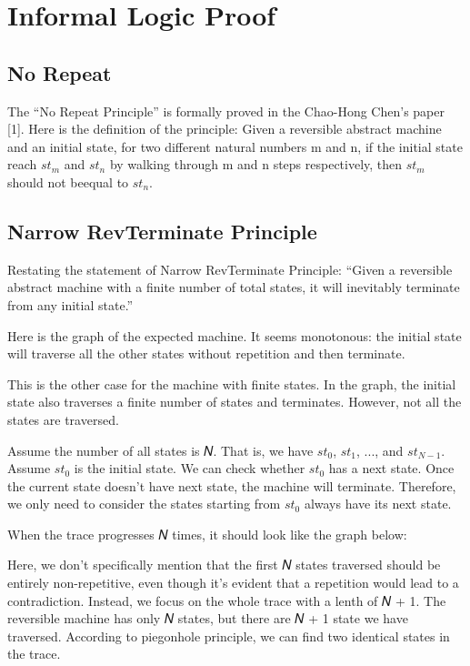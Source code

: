 \section{Informal Logic Proof}

\subsection{ No Repeat }
The ``No Repeat Principle'' is formally proved in the Chao-Hong Chen's paper [1].
Here is the definition of the principle:
Given a reversible abstract machine and an initial state, for two different natural numbers m and n, if the initial state reach $st_{m}$ and $st_{n}$ by walking through m and n steps respectively, then $st_{m}$ should not beequal to $st_{n}$.

\subsection{ Narrow RevTerminate Principle }
Restating the statement of Narrow RevTerminate Principle: 
``Given a reversible abstract machine with a finite number of total states, it will inevitably terminate from any initial state.''

Here is the graph of the expected machine.  It seems monotonous: the initial state will traverse all the other states without repetition and then terminate.



This is the other case for the machine with finite states.  
In the graph, the initial state also traverses a finite number of states and terminates.  However, not all the states are traversed.



Assume the number of all states is 𝑁.  That is, we have $st_{0}$, $st_{1}$, ..., and $st_{𝑁-1}$.
Assume $st_{0}$ is the initial state.  We can check whether $st_{0}$ has a next state.
Once the current state doesn't have next state, the machine will terminate.  
Therefore, we only need to consider the states starting from $st_{0}$ always have its next state.

When the trace progresses 𝑁 times, it should look like the graph below:



Here, we don't specifically mention that the first 𝑁 states traversed should be entirely non-repetitive, even though it's evident that a repetition would lead to a contradiction. 
Instead, we focus on the whole trace with a lenth of 𝑁 + 1.
The reversible machine has only 𝑁 states, but there are 𝑁 + 1 state we have traversed.
According to piegonhole principle, we can find two identical states in the trace.

